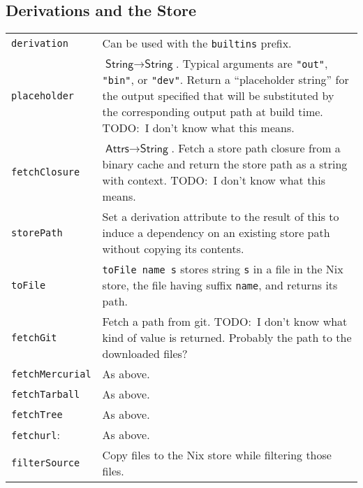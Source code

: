 \documentclass[9pt, a4paper, landscape]{extarticle}
\newcommand{\cmd}[1]{\texttt{#1}}
\newcommand{\str}{\textsf{String}}
\newcommand{\ats}{\textsf{Attrs}}
\begin{document}
\begin{multicols*}{3}

\subsection*{Derivations and the Store}

\begin{tabularx}{\columnwidth}{@{}l>{\raggedright\arraybackslash}X@{}}
  \cmd{derivation} & Can be used with the \cmd{builtins} prefix. \\
  \cmd{placeholder} & $\str\to\str$. Typical arguments are \cmd{"out"},
                      \cmd{"bin"}, or \cmd{"dev"}. Return a ``placeholder string'' for
                      the output specified that will be substituted by
                      the corresponding output path at build
                      time. TODO:\ I don't know what this means. \\
  
  \cmd{fetchClosure} & $\ats\to\str$. Fetch a store path closure from a
                       binary cache and return the store path as a string with
                       context. TODO:\ I don't know what this means. \\
  \cmd{storePath} & Set a derivation attribute to the result of this
                    to induce a dependency on an existing store path
                    without copying its contents. \\
  \cmd{toFile} & \cmd{toFile name s} stores string \cmd{s} in a file
                 in the Nix store, the file having suffix \cmd{name},
                 and returns its path.  \\
                 
  \cmd{fetchGit} & Fetch a path from git. TODO:\ I don't know what
                   kind of value is returned. Probably the path to
                   the downloaded files? \\

  \cmd{fetchMercurial} & As above. \\
  \cmd{fetchTarball} & As above. \\
  \cmd{fetchTree} & As above. \\ 
  \cmd{fetchurl}: & As above. \\

  \cmd{filterSource} & Copy files to the Nix store while filtering
                       those files. \\
  

\end{tabularx}
\end{multicols*}
\end{document}
